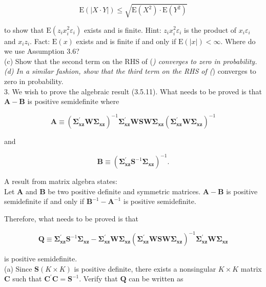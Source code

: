 \documentclass[10pt]{article}
\begin{document}
$$
\mathrm{E}(|X \cdot Y|) \leq \sqrt{\mathrm{E}\left(X^{2}\right) \cdot \mathrm{E}\left(Y^{2}\right)}
$$

to show that $\mathrm{E}\left(z_{i} x_{i}^{2} \varepsilon_{i}\right)$ exists and is finite. Hint: $z_{i} x_{i}^{2} \varepsilon_{i}$ is the product of $x_{i} \varepsilon_{i}$ and $x_{i} z_{i}$. Fact: $\mathrm{E}(x)$ exists and is finite if and only if $\mathrm{E}(|x|)<\infty$. Where do we use Assumption 3.6?\\
(c) Show that the second term on the RHS of (\textit{) converges to zero in probability.\\
(d) In a similar fashion, show that the third term on the RHS of (}) converges to zero in probability.\\
3. We wish to prove the algebraic result (3.5.11). What needs to be proved is that $\mathbf{A}-\mathbf{B}$ is positive semidefinite where

$$
\mathbf{A} \equiv\left(\boldsymbol{\Sigma}_{\mathbf{x z}}^{\prime} \mathbf{W} \boldsymbol{\Sigma}_{\mathbf{x z}}\right)^{-1} \boldsymbol{\Sigma}_{\mathbf{x z}}^{\prime} \mathbf{W S W} \boldsymbol{\Sigma}_{\mathbf{x z}}\left(\boldsymbol{\Sigma}_{\mathbf{x z}}^{\prime} \mathbf{W} \boldsymbol{\Sigma}_{\mathbf{x z}}\right)^{-1}
$$

and

$$
\mathbf{B} \equiv\left(\boldsymbol{\Sigma}_{\mathbf{x z}}^{\prime} \mathbf{S}^{-1} \boldsymbol{\Sigma}_{\mathbf{x z}}\right)^{-1} .
$$

A result from matrix algebra states:\\
Let $\mathbf{A}$ and $\mathbf{B}$ be two positive definite and symmetric matrices. $\mathbf{A}-\mathbf{B}$ is positive semidefinite if and only if $\mathbf{B}^{-1}-\mathbf{A}^{-1}$ is positive semidefinite.

Therefore, what needs to be proved is that

$$
\mathbf{Q} \equiv \boldsymbol{\Sigma}_{\mathbf{x z}}^{\prime} \mathbf{S}^{-1} \boldsymbol{\Sigma}_{\mathbf{x z}}-\boldsymbol{\Sigma}_{\mathbf{x z}}^{\prime} \mathbf{W} \boldsymbol{\Sigma}_{\mathbf{x z}}\left(\boldsymbol{\Sigma}_{\mathbf{x z}}^{\prime} \mathbf{W S W} \boldsymbol{\Sigma}_{\mathbf{x z}}\right)^{-1} \boldsymbol{\Sigma}_{\mathbf{x z}}^{\prime} \mathbf{W} \boldsymbol{\Sigma}_{\mathbf{x z}}
$$

is positive semidefinite.\\
(a) Since $\mathbf{S}(K \times K)$ is positive definite, there exists a nonsingular $K \times K$ matrix $\mathbf{C}$ such that $\mathbf{C}^{\prime} \mathbf{C}=\mathbf{S}^{-1}$. Verify that $\mathbf{Q}$ can be written as
\end{document}
